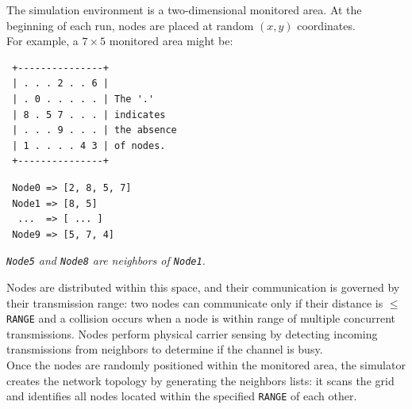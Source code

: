 The simulation environment is a two-dimensional monitored area.
At the beginning of each run, nodes are placed at random $(x, y)$ coordinates.\\
For example, a $7\times 5$ monitored area might be:\\
\begin{minipage}[t]{.44\textwidth}
\flushleft
\begin{verbatim}
 +---------------+
 | . . . 2 . . 6 |
 | . 0 . . . . . | The '.'
 | 8 . 5 7 . . . | indicates
 | . . . 9 . . . | the absence
 | 1 . . . . 4 3 | of nodes.
 +---------------+
\end{verbatim}
\begin{verbatim}
 Node0 => [2, 8, 5, 7] 
 Node1 => [8, 5]       
  ...  => [ ... ]       
 Node9 => [5, 7, 4]
\end{verbatim}
\textit{\texttt{Node5} and \texttt{Node8} are neighbors of \texttt{Node1}.}
\end{minipage}
\begin{minipage}[t]{.55\textwidth}
Nodes are distributed within this space, and their communication is governed by their transmission range: two nodes can communicate only if their distance is $\leq$ \texttt{RANGE} and
a collision occurs when a node is within range of multiple concurrent transmissions.
Nodes perform physical carrier sensing by detecting incoming transmissions from neighbors to determine if the channel is busy.\\
Once the nodes are randomly positioned within the monitored area, the simulator creates the network topology by generating the neighbors lists: it scans the grid and identifies all nodes located within the specified \texttt{RANGE} of each other.\\
\end{minipage}

